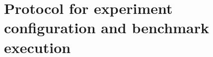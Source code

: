 \documentclass[conference]{IEEEtran}
\begin{document}

\label{sec:protocol}
\section{Protocol for experiment configuration and benchmark execution}
\end{document}
